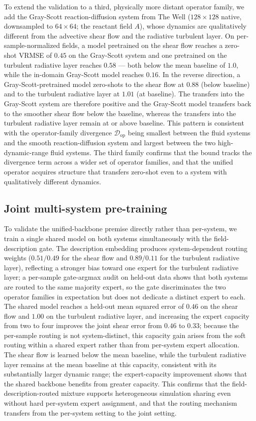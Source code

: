\documentclass[preprint,12pt]{elsarticle}
\begin{document}
To extend the validation to a third, physically more distant operator family, we add the Gray-Scott reaction-diffusion system from The Well ($128\times128$ native, downsampled to $64\times64$; the reactant field $A$), whose dynamics are qualitatively different from the advective shear flow and the radiative turbulent layer. On per-sample-normalized fields, a model pretrained on the shear flow reaches a zero-shot VRMSE of $0.45$ on the Gray-Scott system and one pretrained on the turbulent radiative layer reaches $0.58$ --- both below the mean baseline of $1.0$, while the in-domain Gray-Scott model reaches $0.16$. In the reverse direction, a Gray-Scott-pretrained model zero-shots to the shear flow at $0.88$ (below baseline) and to the turbulent radiative layer at $1.01$ (at baseline). The transfers into the Gray-Scott system are therefore positive and the Gray-Scott model transfers back to the smoother shear flow below the baseline, whereas the transfers into the turbulent radiative layer remain at or above baseline. This pattern is consistent with the operator-family divergence $\mathcal{D}_{\mathrm{op}}$ being smallest between the fluid systems and the smooth reaction-diffusion system and largest between the two high-dynamic-range fluid systems. The third family confirms that the bound tracks the divergence term across a wider set of operator families, and that the unified operator acquires structure that transfers zero-shot even to a system with qualitatively different dynamics.

\subsection{Joint multi-system pre-training}
To validate the unified-backbone premise directly rather than per-system, we train a single shared model on both systems simultaneously with the field-description gate. The description embedding produces system-dependent routing weights ($0.51/0.49$ for the shear flow and $0.89/0.11$ for the turbulent radiative layer), reflecting a stronger bias toward one expert for the turbulent radiative layer; a per-sample gate-argmax audit on held-out data shows that both systems are routed to the same majority expert, so the gate discriminates the two operator families in expectation but does not dedicate a distinct expert to each. The shared model reaches a held-out mean squared error of $0.46$ on the shear flow and $1.00$ on the turbulent radiative layer, and increasing the expert capacity from two to four improves the joint shear error from $0.46$ to $0.33$; because the per-sample routing is not system-distinct, this capacity gain arises from the soft routing within a shared expert rather than from per-system expert allocation. The shear flow is learned below the mean baseline, while the turbulent radiative layer remains at the mean baseline at this capacity, consistent with its substantially larger dynamic range; the expert-capacity improvement shows that the shared backbone benefits from greater capacity. This confirms that the field-description-routed mixture supports heterogeneous simulation sharing even without hard per-system expert assignment, and that the routing mechanism transfers from the per-system setting to the joint setting.
\end{document}
